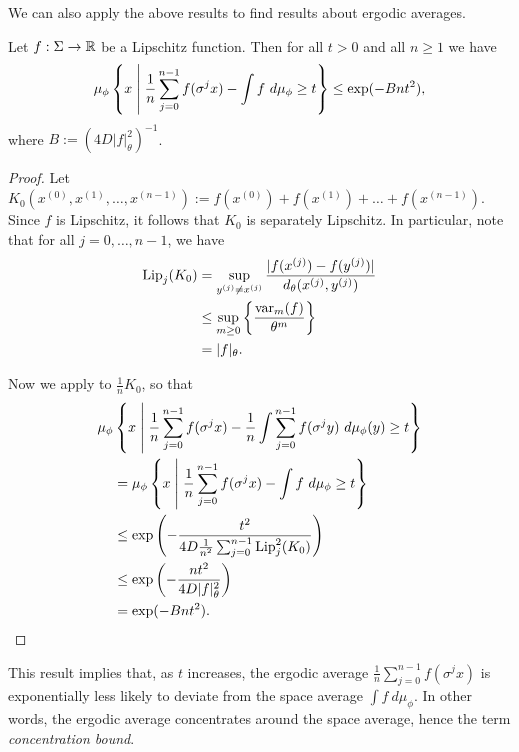 We can also apply the above results to find results about ergodic averages.

\begin{corollary}\label{cor:cm-3-3}
	Let $f : \Sigma \to \mathbb{R}$ be a Lipschitz function. Then for all $t > 0$ and all $n \geq 1$ we have
	\begin{equation}
		\mu_\phi\left\{x \mathrel{}\middle|\mathrel{} \frac{1}{n}\sum_{j = 0}^{n - 1}{f(\sigma^j{x})} - \int{f\ d\mu_\phi} \geq t\right\} \leq \exp(-Bnt^2),
	\end{equation}
	where $B := (4D|f|_\theta^2)^{-1}$.
	\begin{proof}
		Let $K_0(x^{(0)}, x^{(1)}, \dots, x^{(n - 1)}) := f(x^{(0)}) + f(x^{(1)}) + \dots + f(x^{(n - 1)})$. Since $f$ is Lipschitz, it follows that $K_0$ is separately Lipschitz. In particular, note that for all $j = 0, \dots, n - 1$, we have
		\begin{align*}
			\operatorname{Lip}_j(K_0) &= \sup_{y^{(j)} \neq x^{(j)}}{\frac{|f(x^{(j)}) - f(y^{(j)})|}{d_\theta(x^{(j)}, y^{(j)})}} \\
				&\leq \sup_{m \geq 0}\left\{\frac{\operatorname{var}_m(f)}{\theta^m}\right\} \\
				&= |f|_\theta.
		\end{align*}
		
		Now we apply  to $\frac{1}{n}K_0$, so that
		\begin{align*}
			\mu_\phi&\left\{x \mathrel{}\middle|\mathrel{} \frac{1}{n}\sum_{j = 0}^{n - 1}{f(\sigma^j{x})} - \frac{1}{n}\int{\sum_{j = 0}^{n - 1}{f(\sigma^j{y})}\ d\mu_\phi(y)} \geq t\right\} \\
			&=\mu_\phi\left\{x \mathrel{}\middle|\mathrel{} \frac{1}{n}\sum_{j = 0}^{n - 1}{f(\sigma^j{x})} - \int{f\ d\mu_\phi} \geq t\right\} \\
			&\leq \exp\left(-\frac{t^2}{4D\frac{1}{n^2}\sum_{j = 0}^{n - 1}{\operatorname{Lip}_j^2(K_0)}}\right) \\
			&\leq \exp\left(-\frac{nt^2}{4D|f|_\theta^2}\right) \\
			&= \exp(-Bnt^2).
		\end{align*}
	\end{proof}
\end{corollary}

This result implies that, as $t$ increases, the ergodic average $\frac{1}{n}\sum_{j = 0}^{n - 1}{f(\sigma^j{x})}$ is exponentially less likely to deviate from the space average $\int{f\ d\mu_\phi}$. In other words, the ergodic average concentrates around the space average, hence the term \emph{concentration bound}.

